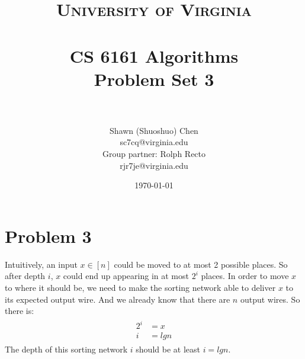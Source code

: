 \documentclass[titlepage, paper=a4, fontsize=11pt]{scrartcl} %
\title{	
\normalfont \normalsize 
\textsc{University of Virginia} \\ [25pt] %
\horrule{0.5pt} \\[0.4cm] %
\huge CS 6161 Algorithms \\
\huge Problem Set 3 \\ %
\horrule{2pt} \\[0.5cm] %
}
\author{Shawn (Shuoshuo) Chen\\sc7cq@virginia.edu\\Group partner: Rolph Recto\\ rjr7je@virginia.edu} %
\date{\normalsize\today} %
\numberwithin{equation}{section} %
\numberwithin{figure}{section} %
\numberwithin{table}{section} %
\begin{document}
\maketitle %


\section*{Problem 3}
Intuitively, an input $x \in [n]$ could be moved to at most 2 possible places. So after depth $i$,
$x$ could end up appearing in at most $2^i$ places. In order to move $x$ to where it should be, we need to make the sorting network able to deliver $x$ to its expected output wire. And we already know that there are $n$ output wires. So there is:
\begin{align*}
\begin{split}
2^i &= x \\
i &= lg n
\end{split}
\end{align*}
The depth of this sorting network $i$ should be at least $i=lg n$.
\end{document}
